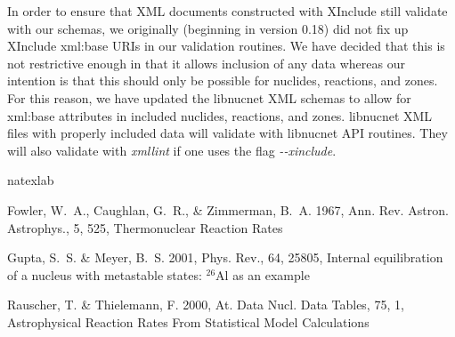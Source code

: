 \documentclass{article}    %
\def\prc{Phys. Rev.}
\def\araa{Ann. Rev. Astron. Astrophys.}
\begin{document}
In order to ensure that XML documents constructed with XInclude still
validate with our schemas, we originally (beginning in version 0.18)
did not fix up XInclude xml:base URIs in our validation routines.
We have decided that this is not restrictive enough in that it allows
inclusion of any data whereas our intention is that this should only be
possible for nuclides, reactions, and zones.  For this reason, we have
updated the libnucnet XML schemas to allow for xml:base attributes
in included nuclides, reactions, and zones.  libnucnet XML files with
properly included data will validate with libnucnet API routines.  They
will also validate with {\em xmllint} if one uses the flag
{\em {-}{-}xinclude}.

\begin{thebibliography}{3}
\expandafter\ifx\csname natexlab\endcsname\relax\def\natexlab#1{#1}\fi

{Fowler}, W.~A., {Caughlan}, G.~R., \& {Zimmerman}, B.~A. 1967, \araa, 5, 525,
  {Thermonuclear Reaction Rates}

{Gupta}, S.~S. \& {Meyer}, B.~S. 2001, \prc, 64, 25805, {Internal equilibration
  of a nucleus with metastable states: $^{26}$Al as an example}

{Rauscher}, T. \& {Thielemann}, F. 2000, At. Data Nucl. Data Tables, 75, 1,
  {Astrophysical Reaction Rates From Statistical Model Calculations}

\end{thebibliography}
\end{document}

